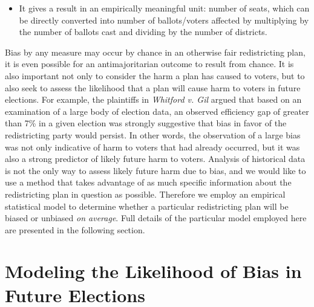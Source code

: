 \documentclass[preprint,12pt]{article}
\begin{document}
\begin{itemize}
\item It gives a result in an empirically meaningful unit: number of seats, which can be directly converted into number of ballots/voters affected by multiplying by the number of ballots cast and dividing by the number of districts.

\end{itemize}

Bias by any measure may occur by chance in an otherwise fair redistricting plan, it is even possible for an antimajoritarian outcome to result from chance.
It is also important not only to consider the harm a plan has caused to voters, but to also seek to assess the likelihood that a plan will cause harm to voters in future elections.
For example, the plaintiffs in \emph{Whitford v. Gil} argued that based on an examination of a large body of election data, an observed efficiency gap of greater than 7\% in a given election was strongly suggestive that bias in favor of the redistricting party would persist.
In other words, the observation of a large bias was not only indicative of harm to voters that had already occurred, but it was also a strong predictor of likely future harm to voters.
Analysis of historical data is not the only way to assess likely future harm due to bias, and we would like to use a method that takes advantage of as much specific information about the redistricting plan in question as possible.
Therefore we employ an empirical statistical model to determine whether a particular redistricting plan will be biased or unbiased \emph{on average}.
Full details of the particular model employed here are presented in the following section.


\section{Modeling the Likelihood of Bias in Future Elections\label{sec:FB}}
\end{document}
